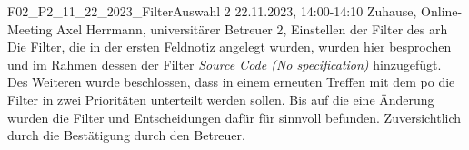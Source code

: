 \fieldnote
{F02\_P2\_11\_22\_2023\_FilterAuswahl}
{2}
{22.11.2023, 14:00-14:10}
{Zuhause, Online-Meeting}
{Axel Herrmann, universitärer Betreuer}
{2, Einstellen der Filter des \gls{arh}}
{
	Die Filter, die in der ersten Feldnotiz angelegt wurden, wurden hier besprochen und im Rahmen dessen der Filter \emph{Source Code (No specification)} hinzugefügt.
  Des Weiteren wurde beschlossen, dass in einem erneuten Treffen mit dem \gls{po} die Filter in zwei Prioritäten unterteilt werden sollen.
}
{}
{Bis auf die eine Änderung wurden die Filter und Entscheidungen dafür für sinnvoll befunden.}
{}
{Zuversichtlich durch die Bestätigung durch den Betreuer.}

